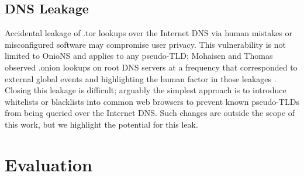 \documentclass[USenglish,oneside,twocolumn]{article}
\begin{document}

\subsection{DNS Leakage}

Accidental leakage of .tor lookups over the Internet DNS via human mistakes or misconfigured software may compromise user privacy. This vulnerability is not limited to OnioNS and applies to any pseudo-TLD; Mohaisen and Thomas observed .onion lookups on root DNS servers at a frequency that corresponded to external global events and highlighting the human factor in those leakages \cite{thomasmeasuring}. Closing this leakage is difficult; arguably the simplest approach is to introduce whitelists or blacklists into common web browsers to prevent known pseudo-TLDs from being queried over the Internet DNS. Such changes are outside the scope of this work, but we highlight the potential for this leak.





\section{Evaluation}
\label{sec:Evaluation}
\end{document}
